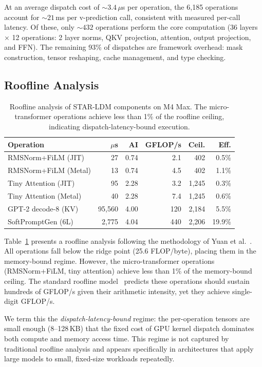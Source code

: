 \documentclass[sigconf,authordraft]{acmart}
\begin{document}
At an average dispatch cost of ${\sim}3.4\,\mu$s per operation, the 6{,}185 operations account for ${\sim}21$\,ms per v-prediction call, consistent with measured per-call latency. Of these, only ${\sim}432$ operations perform the core computation (36 layers $\times$ 12 operations: 2 layer norms, QKV projection, attention, output projection, and FFN). The remaining 93\% of dispatches are framework overhead: mask construction, tensor reshaping, cache management, and type checking.

\subsection{Roofline Analysis}

\begin{table}[t]
\caption{Roofline analysis of STAR-LDM components on M4 Max. The micro-transformer operations achieve less than 1\% of the roofline ceiling, indicating dispatch-latency-bound execution.}
\label{tab:roofline}
\begin{tabular}{lrrrrr}
\toprule
Operation & $\mu$s & AI & GFLOP/s & Ceil. & Eff. \\
\midrule
RMSNorm+FiLM (JIT) & 27 & 0.74 & 2.1 & 402 & 0.5\% \\
RMSNorm+FiLM (Metal) & 13 & 0.74 & 4.5 & 402 & 1.1\% \\
Tiny Attention (JIT) & 95 & 2.28 & 3.2 & 1{,}245 & 0.3\% \\
Tiny Attention (Metal) & 40 & 2.28 & 7.4 & 1{,}245 & 0.6\% \\
GPT-2 decode-8 (KV) & 95{,}560 & 4.00 & 120 & 2{,}184 & 5.5\% \\
SoftPromptGen (6L) & 2{,}775 & 4.04 & 440 & 2{,}206 & 19.9\% \\
\bottomrule
\end{tabular}
\end{table}

Table~\ref{tab:roofline} presents a roofline analysis following the methodology of Yuan et al.~\cite{yuan2024llminference}. All operations fall below the ridge point (25.6 FLOP/byte), placing them in the memory-bound regime. However, the micro-transformer operations (RMSNorm+FiLM, tiny attention) achieve less than 1\% of the memory-bound ceiling. The standard roofline model~\cite{williams2009roofline} predicts these operations should sustain hundreds of GFLOP/s given their arithmetic intensity, yet they achieve single-digit GFLOP/s.

We term this the \textit{dispatch-latency-bound} regime: the per-operation tensors are small enough (8--128\,KB) that the fixed cost of GPU kernel dispatch dominates both compute and memory access time. This regime is not captured by traditional roofline analysis and appears specifically in architectures that apply large models to small, fixed-size workloads repeatedly.
\end{document}
